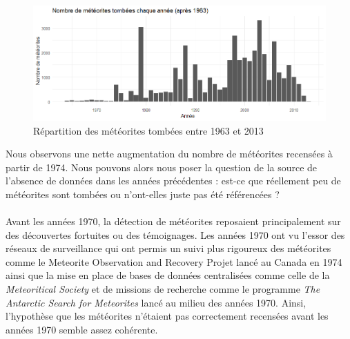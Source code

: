 \documentclass[12pt]{article}
\begin{document}
\begin{figure}[H]
\centering
\includegraphics[width=16cm]{Images/exploration/histogramme1963-2013.png}
\caption{Répartition des météorites tombées entre 1963 et 2013}
\end{figure}
Nous observons une nette augmentation du nombre de météorites recensées à partir de 1974. Nous pouvons alors nous poser la question de la source de l'absence de données dans les années précédentes : est-ce que réellement peu de météorites sont tombées ou n'ont-elles juste pas été référencées ?\\
\\
Avant les années 1970, la détection de météorites reposaient principalement sur des découvertes fortuites ou des témoignages. Les années 1970 ont vu l'essor des réseaux de surveillance qui ont permis un suivi plus rigoureux des météorites comme le Meteorite Observation and Recovery Projet \cite{Article_Canada_1970} lancé au Canada en 1974 ainsi que la mise en place de bases de données centralisées comme celle de la \textit{Meteoritical Society} \cite{BDD_centralisees} et de missions de recherche comme le programme \textit{The Antarctic Search for Meteorites} \cite{Mission_recherche_antartictique} lancé au milieu des années 1970. Ainsi, l'hypothèse que les météorites n'étaient pas correctement recensées avant les années 1970 semble assez cohérente.
\end{document}
